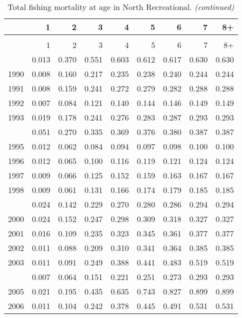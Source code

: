 \documentclass[
]{article}
\begin{document}
\begin{longtable}[t]{lrrrrrrrr}
\caption{\label{tab:North_Recreational-fleet-FAA-table}Total fishing mortality at age in North Recreational.}\\
\toprule
  & 1 & 2 & 3 & 4 & 5 & 6 & 7 & 8+\\
\midrule
\endfirsthead
\caption[]{Total fishing mortality at age in North Recreational. \textit{(continued)}}\\
\toprule
  & 1 & 2 & 3 & 4 & 5 & 6 & 7 & 8+\\
\midrule
\endhead

\endfoot
\bottomrule
\endlastfoot
1989 & 0.013 & 0.370 & 0.551 & 0.603 & 0.612 & 0.617 & 0.630 & 0.630\\
1990 & 0.008 & 0.160 & 0.217 & 0.235 & 0.238 & 0.240 & 0.244 & 0.244\\
1991 & 0.008 & 0.159 & 0.241 & 0.272 & 0.279 & 0.282 & 0.288 & 0.288\\
1992 & 0.007 & 0.084 & 0.121 & 0.140 & 0.144 & 0.146 & 0.149 & 0.149\\
1993 & 0.019 & 0.178 & 0.241 & 0.276 & 0.283 & 0.287 & 0.293 & 0.293\\
\addlinespace
1994 & 0.051 & 0.270 & 0.335 & 0.369 & 0.376 & 0.380 & 0.387 & 0.387\\
1995 & 0.012 & 0.062 & 0.084 & 0.094 & 0.097 & 0.098 & 0.100 & 0.100\\
1996 & 0.012 & 0.065 & 0.100 & 0.116 & 0.119 & 0.121 & 0.124 & 0.124\\
1997 & 0.009 & 0.066 & 0.125 & 0.152 & 0.159 & 0.163 & 0.167 & 0.167\\
1998 & 0.009 & 0.061 & 0.131 & 0.166 & 0.174 & 0.179 & 0.185 & 0.185\\
\addlinespace
1999 & 0.024 & 0.142 & 0.229 & 0.270 & 0.280 & 0.286 & 0.294 & 0.294\\
2000 & 0.024 & 0.152 & 0.247 & 0.298 & 0.309 & 0.318 & 0.327 & 0.327\\
2001 & 0.016 & 0.109 & 0.235 & 0.323 & 0.345 & 0.361 & 0.377 & 0.377\\
2002 & 0.011 & 0.088 & 0.209 & 0.310 & 0.341 & 0.364 & 0.385 & 0.385\\
2003 & 0.011 & 0.091 & 0.249 & 0.388 & 0.441 & 0.483 & 0.519 & 0.519\\
\addlinespace
2004 & 0.007 & 0.064 & 0.151 & 0.221 & 0.251 & 0.273 & 0.293 & 0.293\\
2005 & 0.021 & 0.195 & 0.435 & 0.635 & 0.743 & 0.827 & 0.899 & 0.899\\
2006 & 0.011 & 0.104 & 0.242 & 0.378 & 0.445 & 0.491 & 0.531 & 0.531\\

\end{longtable}
\end{document}
